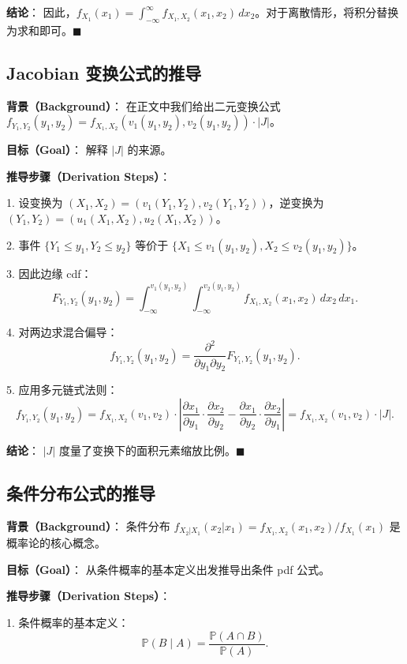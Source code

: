\textbf{结论}：
因此，$f_{X_1}(x_1) = \int_{-\infty}^{\infty} f_{X_1, X_2}(x_1, x_2) \, dx_2$。对于离散情形，将积分替换为求和即可。$\blacksquare$

\subsection{Jacobian 变换公式的推导}\label{sec:derivation-jacobian}

\textbf{背景（Background）}：
在正文中我们给出二元变换公式 $f_{Y_1, Y_2}(y_1, y_2) = f_{X_1, X_2}(v_1(y_1, y_2), v_2(y_1, y_2)) \cdot |J|$。

\textbf{目标（Goal）}：
解释 $|J|$ 的来源。

\textbf{推导步骤（Derivation Steps）}：

1. 设变换为 $(X_1, X_2) = (v_1(Y_1, Y_2), v_2(Y_1, Y_2))$，逆变换为 $(Y_1, Y_2) = (u_1(X_1, X_2), u_2(X_1, X_2))$。

2. 事件 $\{Y_1 \leq y_1, Y_2 \leq y_2\}$ 等价于 $\{X_1 \leq v_1(y_1, y_2), X_2 \leq v_2(y_1, y_2)\}$。

3. 因此边缘 cdf：
\[
F_{Y_1, Y_2}(y_1, y_2) = \int_{-\infty}^{v_1(y_1, y_2)} \int_{-\infty}^{v_2(y_1, y_2)} f_{X_1, X_2}(x_1, x_2) \, dx_2 \, dx_1.
\]

4. 对两边求混合偏导：
\[
f_{Y_1, Y_2}(y_1, y_2) = \frac{\partial^2}{\partial y_1 \partial y_2} F_{Y_1, Y_2}(y_1, y_2).
\]

5. 应用多元链式法则：
\[
f_{Y_1, Y_2}(y_1, y_2) = f_{X_1, X_2}(v_1, v_2) \cdot \left| \frac{\partial x_1}{\partial y_1} \cdot \frac{\partial x_2}{\partial y_2} - \frac{\partial x_1}{\partial y_2} \cdot \frac{\partial x_2}{\partial y_1} \right| = f_{X_1, X_2}(v_1, v_2) \cdot |J|.
\]

\textbf{结论}：
$|J|$ 度量了变换下的面积元素缩放比例。$\blacksquare$

\subsection{条件分布公式的推导}\label{sec:derivation-conditional-distribution}

\textbf{背景（Background）}：
条件分布 $f_{X_2|X_1}(x_2|x_1) = f_{X_1, X_2}(x_1, x_2) / f_{X_1}(x_1)$ 是概率论的核心概念。

\textbf{目标（Goal）}：
从条件概率的基本定义出发推导出条件 pdf 公式。

\textbf{推导步骤（Derivation Steps）}：

1. 条件概率的基本定义：
\[
\mathbb{P}(B \mid A) = \frac{\mathbb{P}(A \cap B)}{\mathbb{P}(A)}.
\]

